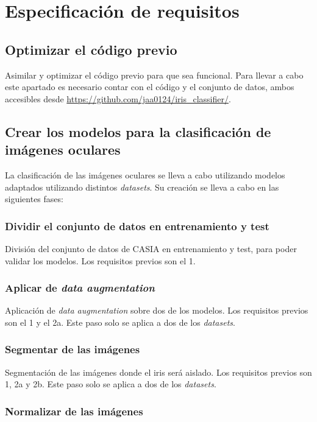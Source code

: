 \section{Especificación de requisitos}

\subsection{Optimizar el código previo}

Asimilar y optimizar el código previo para que sea funcional. Para llevar a cabo este apartado es necesario contar con el código y el conjunto de datos, ambos accesibles desde \url{https://github.com/jaa0124/iris_classifier/}.

\subsection{Crear los modelos para la clasificación de imágenes oculares}

La clasificación de las imágenes oculares se lleva a cabo utilizando modelos adaptados utilizando distintos \textit{datasets}. Su creación se lleva a cabo en las siguientes fases:

\subsubsection{Dividir el conjunto de datos en entrenamiento y test}

División del conjunto de datos de CASIA en entrenamiento y test, para poder validar los modelos. Los requisitos previos son el 1.

\subsubsection{Aplicar de \textit{data augmentation}}

Aplicación de \textit{data augmentation} sobre dos de los modelos. Los requisitos previos son el 1 y el 2a. Este paso solo se aplica a dos de los \textit{datasets}.

\subsubsection{Segmentar de las imágenes}

Segmentación de las imágenes donde el iris será aislado. Los requisitos previos son 1, 2a y 2b. Este paso solo se aplica a dos de los \textit{datasets}.

\subsubsection{Normalizar de las imágenes}

